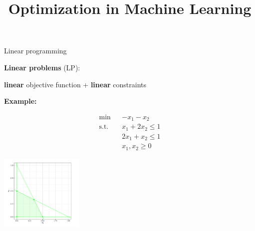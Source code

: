 \documentclass[11pt,compress,t,notes=noshow, xcolor=table]{beamer}
\title{Optimization in Machine Learning}
\date{}
\begin{document}
\sloppy

\begin{vbframe}{Linear programming}

\textbf{Linear problems} (LP):
\begin{center}
    \textbf{linear} objective function + \textbf{linear} constraints
\end{center}

\textbf{Example:}

\vspace*{-1cm}
\begin{footnotesize}
\begin{eqnarray*}
\min && - x_1 - x_2 \\
\text{s.t. } && x_1 + 2x_2 \le 1\\
&& 2x_1 + x_2 \le 1 \\
&& x_1, x_2 \ge 0
\end{eqnarray*}
\end{footnotesize}

\begin{center}
\includegraphics[width = 0.3\textwidth]{figure_man/linear-pro-example.png}
\end{center}









\end{vbframe}
\end{document}
